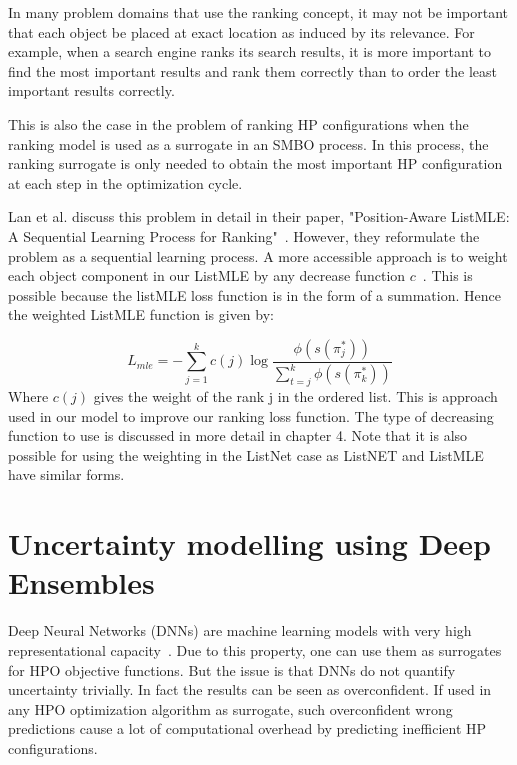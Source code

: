 \documentclass[12pt, twoside, ngerman]{report}
\begin{document}
In many problem domains that use the ranking concept,  it may not be important that each object be placed at exact location as induced by its relevance.
For example,  when a search engine ranks its search results, it is more important to find the most important results and rank them correctly than to order the least important results correctly.

This is also the case in the problem of ranking HP configurations when the ranking model is used as a surrogate in an SMBO process.
In this process,  the ranking surrogate is only needed to obtain the most important HP configuration at each step in the optimization cycle.

Lan et al.  discuss this problem in detail in their paper,  "Position-Aware ListMLE: A Sequential Learning Process for Ranking"~\cite{positionawarerankinglistmle}.
However,  they reformulate the problem as a sequential learning process.
A more accessible approach is to weight each object component in our ListMLE by any decrease function $c$~\cite{TRLWO}.
This is possible because the listMLE loss function is in the form of a summation.
Hence the weighted ListMLE function is given by:

\begin{equation}
L_{mle} = -  \sum\limits_{j=1}^{k} c(j) \log \frac{\phi(s(\pi^*_j))}{ \sum\limits_{t=j}^k \phi(s(\pi^*_k))}
\end{equation}
Where $c(j)$ gives the weight of the rank j in the ordered list.
This is approach used in our model to improve our ranking loss function.
The type of decreasing function to use is discussed in more detail in chapter 4.
Note that it is also possible for using the weighting in the ListNet case as ListNET and ListMLE have similar forms.

\section{Uncertainty modelling using Deep Ensembles}\label{sec:uncertaintyDeepEnsembles}

Deep Neural Networks (DNNs) are machine learning models with very high representational capacity~\cite{Goodfellow-et-al-2016}.
Due to this property,  one can use them as surrogates for HPO objective functions.
But the issue is that DNNs do not quantify uncertainty trivially.
In fact the results can be seen as overconfident.
If used in any HPO optimization algorithm as surrogate,  such overconfident wrong predictions cause a lot of computational overhead by predicting inefficient HP configurations.
\end{document}

